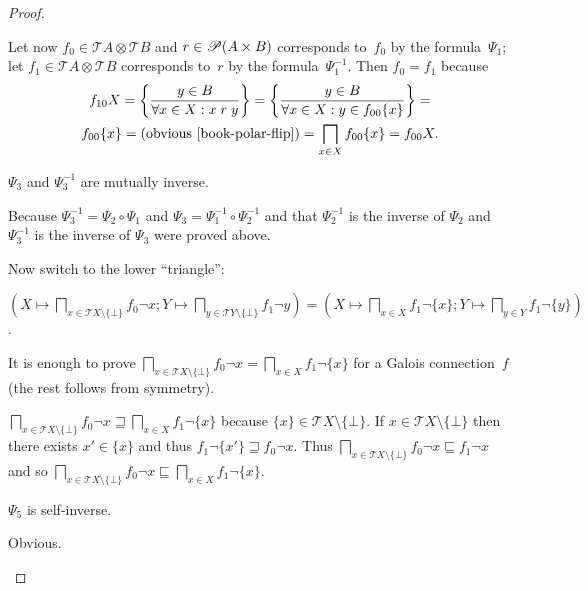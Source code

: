 \begin{proof}
\begin{claimproof}
Let now $f_{0}\in\mathscr{T}A\otimes\mathscr{T}B$ and $r\in\mathscr{P}(A\times B)$
corresponds to~$f_{0}$ by the formula~$\Psi_1$; let $f_{1}\in\mathscr{T}A\otimes\mathscr{T}B$
corresponds to~$r$ by the formula~$\Psi_1^{-1}$. Then $f_0=f_1$ because
\begin{multline*}
f_{10} X = \setcond{y\in B}{\forall x\in X:x\mathrel{r}y} = \setcond{y\in B}{\forall x\in X:y\in f_{00}\{x\}} = \\
f_{00}\{x\} = \text{(obvious~\bookref{polar-flip})} = \bigsqcap_{x\in X}f_{00}\{x\} = f_{00}X.
\end{multline*}
\end{claimproof}

\begin{claim}
$\Psi_3$ and $\Psi_3^{-1}$ are mutually inverse.
\end{claim}
\begin{claimproof}
Because $\Psi_3^{-1} = \Psi_2\circ\Psi_1$ and $\Psi_3 = \Psi_1^{-1}\circ\Psi_2^{-1}$
and that $\Psi_2^{-1}$ is the inverse of $\Psi_2$ and $\Psi_3^{-1}$ is the inverse of $\Psi_3$ were proved above.
\end{claimproof}

Now switch to the lower ``triangle'':

\begin{flushleft}
\begin{claim}
$\left(X\mapsto\bigsqcap_{x\in\mathscr{T}X\setminus\{\bot\}}f_0\lnot x;Y\mapsto\bigsqcap_{y\in\mathscr{T}Y\setminus\{\bot\}}f_1\lnot y\right)=\left(X\mapsto\bigsqcap_{x\in X}f_1\lnot\{x\};Y\mapsto\bigsqcap_{y\in Y}f_1\lnot\{y\}\right)$.
\end{claim}
\end{flushleft}
\begin{claimproof}
It is enough to prove $\bigsqcap_{x\in\mathscr{T}X\setminus\{\bot\}}f_0\lnot x = \bigsqcap_{x\in X}f_1\lnot\{x\}$ for a Galois connection~$f$
(the rest follows from symmetry).

$\bigsqcap_{x\in\mathscr{T}X\setminus\{\bot\}}f_0\lnot x \sqsupseteq \bigsqcap_{x\in X}f_1\lnot\{x\}$ because $\{x\}\in\mathscr{T}X\setminus\{\bot\}$.
If $x\in\mathscr{T}X\setminus\{\bot\}$ then there exists $x'\in\{x\}$ and thus $f_1\lnot\{x'\}\sqsupseteq f_0\lnot x$. Thus
$\bigsqcap_{x\in\mathscr{T}X\setminus\{\bot\}}f_0\lnot x \sqsubseteq f_1\lnot x$ and so
$\bigsqcap_{x\in\mathscr{T}X\setminus\{\bot\}}f_0\lnot x \sqsubseteq \bigsqcap_{x\in X}f_1\lnot\{x\}$.
\end{claimproof}

\begin{claim}
$\Psi_5$ is self-inverse.
\end{claim}
\begin{claimproof}
Obvious.
\end{claimproof}


\end{proof}
